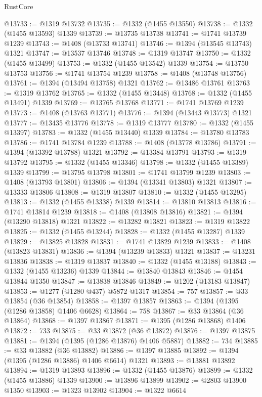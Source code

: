 \begin{lexlean}{RustCore}
\begin{coremodule}
@13733 := @1319 @13732
@13735 := @1332 (@1455 @13550)
@13738 := @1332 (@1455 @13593) @1339
@13739 := @13735 @13738
@13741 := @1741 @13739 @1239
@13743 := @1408 (@13733 @13741)
@13746 := @1394 (@13545 @13743) @1321
@13747 := @13537 @13746
@13748 := @1319 @13747
@13750 := @1332 (@1455 @13499)
@13753 := @1332 (@1455 @13542) @1339
@13754 := @13750 @13753
@13756 := @1741 @13754 @1239
@13758 := @1408 (@13748 @13756)
@13761 := @1394 (@13494 @13758) @1321
@13762 := @13486 @13761
@13763 := @1319 @13762
@13765 := @1332 (@1455 @13448)
@13768 := @1332 (@1455 @13491) @1339
@13769 := @13765 @13768
@13771 := @1741 @13769 @1239
@13773 := @1408 (@13763 @13771)
@13776 := @1394 (@13443 @13773) @1321
@13777 := @13435 @13776
@13778 := @1319 @13777
@13780 := @1332 (@1455 @13397)
@13783 := @1332 (@1455 @13440) @1339
@13784 := @13780 @13783
@13786 := @1741 @13784 @1239
@13788 := @1408 (@13778 @13786)
@13791 := @1394 (@13392 @13788) @1321
@13792 := @13384 @13791
@13793 := @1319 @13792
@13795 := @1332 (@1455 @13346)
@13798 := @1332 (@1455 @13389) @1339
@13799 := @13795 @13798
@13801 := @1741 @13799 @1239
@13803 := @1408 (@13793 @13801)
@13806 := @1394 (@13341 @13803) @1321
@13807 := @13333 @13806
@13808 := @1319 @13807
@13810 := @1332 (@1455 @13295)
@13813 := @1332 (@1455 @13338) @1339
@13814 := @13810 @13813
@13816 := @1741 @13814 @1239
@13818 := @1408 (@13808 @13816)
@13821 := @1394 (@13290 @13818) @1321
@13822 := @13282 @13821
@13823 := @1319 @13822
@13825 := @1332 (@1455 @13244)
@13828 := @1332 (@1455 @13287) @1339
@13829 := @13825 @13828
@13831 := @1741 @13829 @1239
@13833 := @1408 (@13823 @13831)
@13836 := @1394 (@13239 @13833) @1321
@13837 := @13231 @13836
@13838 := @1319 @13837
@13840 := @1332 (@1455 @13188)
@13843 := @1332 (@1455 @13236) @1339
@13844 := @13840 @13843
@13846 := @1454 @13844 @1350
@13847 := @13838 @13846
@13849 := @1202 (@13183 @13847)
@13853 := @1277 (@1280 @437) @5872 @1317
@13854 := 757
@13857 := @33 @13854 (@36 @13854)
@13858 := @1397 @13857
@13863 := @1394 (@1395 (@1286 @13858) @1406 @6628)
@13864 := 758
@13867 := @33 @13864 (@36 @13864)
@13868 := @1397 @13867
@13871 := @1395 (@1286 @13868) @1406
@13872 := 733
@13875 := @33 @13872 (@36 @13872)
@13876 := @1397 @13875
@13881 := @1394 (@1395 (@1286 @13876) @1406 @5887)
@13882 := 734
@13885 := @33 @13882 (@36 @13882)
@13886 := @1397 @13885
@13892 := @1394 (@1395 (@1286 @13886) @1406 @6614) @1321
@13893 := @13881 @13892
@13894 := @1319 @13893
@13896 := @1332 (@1455 @13876)
@13899 := @1332 (@1455 @13886) @1339
@13900 := @13896 @13899
@13902 := @2803 @13900 @1350
@13903 := @1323 @13902
@13904 := @1322 @6614

\end{coremodule}
\end{lexlean}
